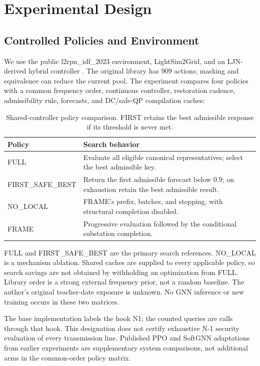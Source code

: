 \section{Experimental Design}

\subsection{Controlled Policies and Environment}

We use the public l2rpn\_idf\_2023 environment, LightSim2Grid, and an LJN-derived hybrid controller \citep{grid2op,ljn2023agent}. The original library has 909 actions; masking and equivalence can reduce the current pool. The experiment compares four policies with a common frequency order, continuous controller, restoration cadence, admissibility rule, forecasts, and DC/safe-QP compilation caches:


\begin{table}[t]
\centering
\begin{tabular}{@{}p{}p{}@{}}
\toprule
Policy & Search behavior \\
\midrule
FULL & Evaluate all eligible canonical representatives; select the best admissible key. \\
FIRST\_SAFE\_BEST & Return the first admissible forecast below 0.9; on exhaustion retain the best admissible result. \\
NO\_LOCAL & FRAME's prefix, batches, and stopping, with structural completion disabled. \\
FRAME & Progressive evaluation followed by the conditional substation completion. \\
\bottomrule
\end{tabular}
\caption*{Shared-controller policy comparison. FIRST retains the best admissible response if its threshold is never met.}
\end{table}

FULL and FIRST\_SAFE\_BEST are the primary search references. NO\_LOCAL is a mechanism ablation. Shared caches are supplied to every applicable policy, so search savings are not obtained by withholding an optimization from FULL. Library order is a strong external frequency prior, not a random baseline. The author's original teacher-date exposure is unknown. No GNN inference or new training occurs in these two matrices.


The base implementation labels the hook N1; the counted queries are calls through that hook. This designation does not certify exhaustive N-1 security evaluation of every transmission line. Published PPO and SoftGNN adaptations from earlier experiments are supplementary system comparisons, not additional arms in the common-order policy matrix.


